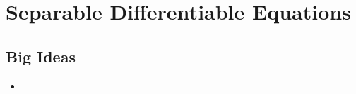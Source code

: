 \chapter{Separable Differentiable Equations}
\label{chap:SDE}

\section{Big Ideas}
\label{sec:SDE Big Ideas}
\begin{itemize}
  \item 
\end{itemize}